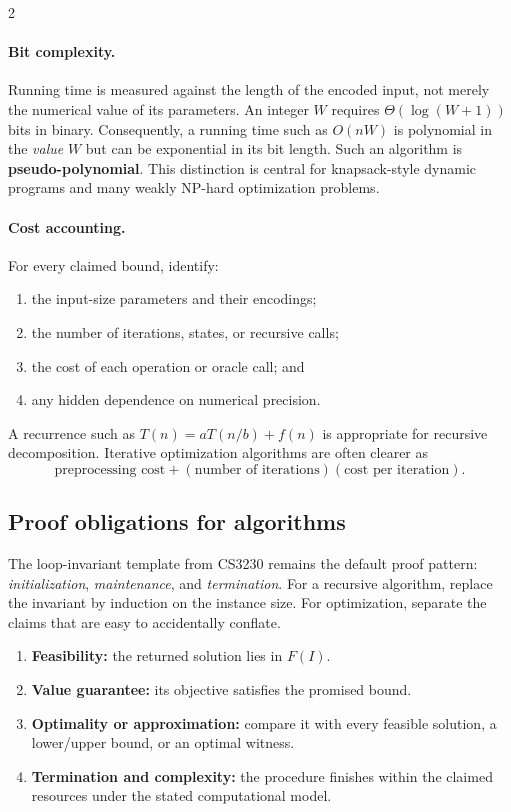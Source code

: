 \documentclass[10pt]{article}
\theoremstyle{definition}
\begin{document}
\begin{multicols*}{2}
\paragraph{Bit complexity.}
Running time is measured against the length of the encoded input, not merely
the numerical value of its parameters.  An integer $W$ requires
$\Theta(\log(W+1))$ bits in binary.  Consequently, a running time such as
$O(nW)$ is polynomial in the \emph{value} $W$ but can be exponential in its
bit length.  Such an algorithm is \textbf{pseudo-polynomial}.  This distinction
is central for knapsack-style dynamic programs and many weakly NP-hard
optimization problems.

\paragraph{Cost accounting.}
For every claimed bound, identify:
\begin{enumerate}
  \item the input-size parameters and their encodings;
  \item the number of iterations, states, or recursive calls;
  \item the cost of each operation or oracle call; and
  \item any hidden dependence on numerical precision.
\end{enumerate}
A recurrence such as $T(n)=aT(n/b)+f(n)$ is appropriate for recursive
decomposition.  Iterative optimization algorithms are often clearer as
\[
  \text{preprocessing cost}
  + (\text{number of iterations})(\text{cost per iteration}).
\]

\subsection{Proof obligations for algorithms}

The loop-invariant template from CS3230 remains the default proof pattern:
\emph{initialization}, \emph{maintenance}, and \emph{termination}.  For a
recursive algorithm, replace the invariant by induction on the instance size.
For optimization, separate the claims that are easy to accidentally conflate.

\begin{enumerate}
  \item \textbf{Feasibility:} the returned solution lies in $F(I)$.
  \item \textbf{Value guarantee:} its objective satisfies the promised bound.
  \item \textbf{Optimality or approximation:} compare it with every feasible
        solution, a lower/upper bound, or an optimal witness.
  \item \textbf{Termination and complexity:} the procedure finishes within the
        claimed resources under the stated computational model.
\end{enumerate}


\end{multicols*}
\end{document}

